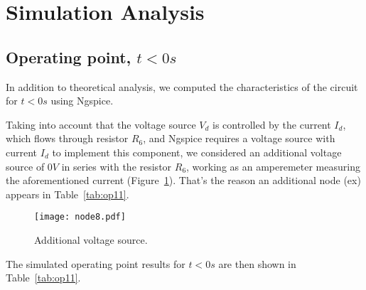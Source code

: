 \section{Simulation Analysis}
\label{sec:simulation}

\subsection{Operating point, $t<0s$} \label{subsec:op}

In addition to theoretical analysis, we computed the characteristics of the circuit for $t<0s$ using Ngspice.

Taking into account that the voltage source $V_d$ is controlled by the current $I_d$, which flows through resistor $R_6$, and Ngspice requires a voltage source with current $I_d$ to implement this component, we considered an additional voltage source of $0V$ in series with the resistor $R_6$, working as an amperemeter measuring the aforementioned current (Figure~\ref{fig:node8}). That's the reason an additional node (ex) appears in Table~\ref{tab:op11}.

\begin{figure}[H] \centering
\texttt{[image: node8.pdf]}
\caption{Additional voltage source.}
\label{fig:node8}
\end{figure}

The simulated operating point results for $t<0s$ are then shown in Table~\ref{tab:op11}.

\vspace{1.1mm}

